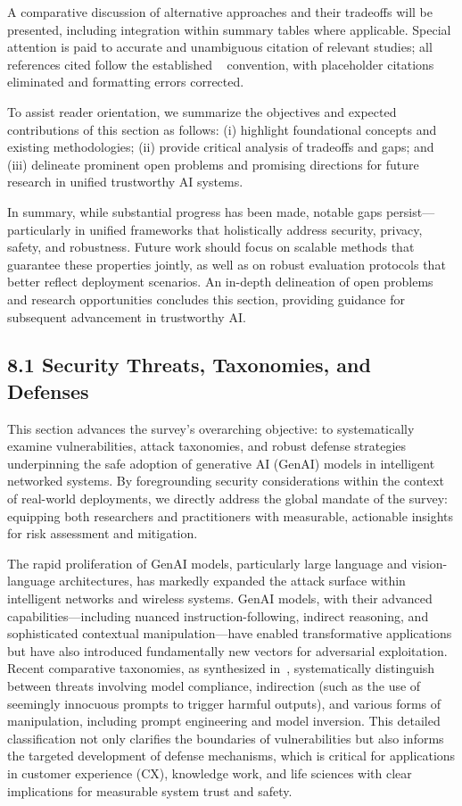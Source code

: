 \documentclass[sigconf]{acmart}
\begin{document}
A comparative discussion of alternative approaches and their tradeoffs will be presented, including integration within summary tables where applicable. Special attention is paid to accurate and unambiguous citation of relevant studies; all references cited follow the established ~\cite{} convention, with placeholder citations eliminated and formatting errors corrected.

To assist reader orientation, we summarize the objectives and expected contributions of this section as follows: (i) highlight foundational concepts and existing methodologies; (ii) provide critical analysis of tradeoffs and gaps; and (iii) delineate prominent open problems and promising directions for future research in unified trustworthy AI systems.

In summary, while substantial progress has been made, notable gaps persist—particularly in unified frameworks that holistically address security, privacy, safety, and robustness. Future work should focus on scalable methods that guarantee these properties jointly, as well as on robust evaluation protocols that better reflect deployment scenarios. An in-depth delineation of open problems and research opportunities concludes this section, providing guidance for subsequent advancement in trustworthy AI.

\subsection{8.1 Security Threats, Taxonomies, and Defenses}

This section advances the survey's overarching objective: to systematically examine vulnerabilities, attack taxonomies, and robust defense strategies underpinning the safe adoption of generative AI (GenAI) models in intelligent networked systems. By foregrounding security considerations within the context of real-world deployments, we directly address the global mandate of the survey: equipping both researchers and practitioners with measurable, actionable insights for risk assessment and mitigation.

The rapid proliferation of GenAI models, particularly large language and vision-language architectures, has markedly expanded the attack surface within intelligent networks and wireless systems. GenAI models, with their advanced capabilities—including nuanced instruction-following, indirect reasoning, and sophisticated contextual manipulation—have enabled transformative applications but have also introduced fundamentally new vectors for adversarial exploitation. Recent comparative taxonomies, as synthesized in~\cite{ref3}, systematically distinguish between threats involving model compliance, indirection (such as the use of seemingly innocuous prompts to trigger harmful outputs), and various forms of manipulation, including prompt engineering and model inversion. This detailed classification not only clarifies the boundaries of vulnerabilities but also informs the targeted development of defense mechanisms, which is critical for applications in customer experience (CX), knowledge work, and life sciences with clear implications for measurable system trust and safety.
\end{document}
